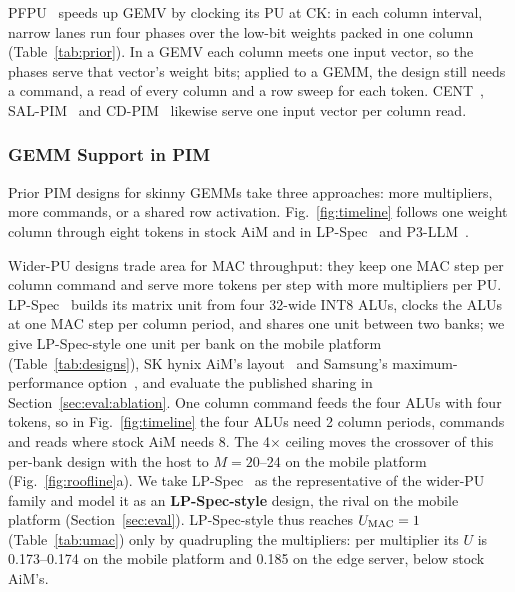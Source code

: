 \begin{table}[t]
  \caption{Prior PIM designs on $M$ tokens of one weight column; GEMM denotes a skinny GEMM.}
  \label{tab:prior}
  \centering
  \scriptsize
  \setlength{\tabcolsep}{2pt}
  
\end{table}

PFPU~\cite{pfpu} speeds up GEMV by clocking its PU at CK: in each column interval, narrow lanes
run four phases over the low-bit weights packed in one column (Table~\ref{tab:prior}). In a GEMV each column meets one
input vector, so the phases serve that vector's weight bits; applied to a GEMM, the design still needs a command, a
read of every column and a row sweep for each token. CENT~\cite{cent}, SAL-PIM~\cite{salpim} and CD-PIM~\cite{cdpim}
likewise serve one input vector per column read.

\subsubsection{GEMM Support in PIM}
\label{sec:bg:gemm}

Prior PIM designs for skinny GEMMs take three approaches: more multipliers, more commands, or a shared row activation.
Fig.~\ref{fig:timeline} follows one weight column through eight tokens in stock AiM and in LP-Spec~\cite{lpspec}
and P3-LLM~\cite{p3llm}.

Wider-PU designs trade area for MAC throughput: they keep one MAC step per column command
and serve more tokens per step with more multipliers per PU.
LP-Spec~\cite{lpspec} builds its matrix unit from four 32-wide INT8 ALUs, clocks the ALUs at one MAC step per column
period, and shares one unit between two banks; we give LP-Spec-style one unit per bank on the mobile platform (Table~\ref{tab:designs}),
SK hynix AiM's layout~\cite{aimjssc} and Samsung's maximum-performance option~\cite{hc35pim}, and evaluate the published sharing in
Section~\ref{sec:eval:ablation}. One column
command feeds the four ALUs with four tokens, so in Fig.~\ref{fig:timeline} the four ALUs need 2 column periods,
commands and reads where stock AiM needs 8. The 4$\times$ ceiling moves the crossover of this
per-bank design with the host to $M = 20$--24 on the mobile platform (Fig.~\ref{fig:roofline}a).
We take
LP-Spec~\cite{lpspec} as the representative of the wider-PU family and model it as an \textbf{LP-Spec-style} design,
the rival on the mobile platform (Section~\ref{sec:eval}). LP-Spec-style thus
reaches $\UMAC = 1$ (Table~\ref{tab:umac}) only by quadrupling the multipliers: per multiplier its $U$
is 0.173--0.174 on the mobile platform and 0.185 on the edge server, below stock AiM's.

